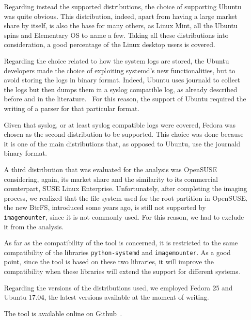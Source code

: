\documentclass[a4paper]{article}
\begin{document}
Regarding instead the supported distributions, the choice of supporting Ubuntu
was quite obvious. This distribution, indeed, apart from having a large market
share by itself, is also the base for many others, as Linux Mint, all the Ubuntu
spins and Elementary OS to name a few. Taking all these distributions into
consideration, a good percentage of the Linux desktop users is covered.

Regarding the choice related to how the system logs are stored, the Ubuntu
developers made the choice of exploiting systemd's new functionalities, but to
avoid storing the logs in binary format. Indeed, Ubuntu uses journald to collect
the logs but then dumps them in a syslog compatible log, as already described
before and in the literature.~\cite{patil2016digital} For this reason, the
support of Ubuntu required the writing of a parser for that particular format.

Given that syslog, or at least syslog compatible logs were covered, Fedora was
chosen as the second distribution to be supported. This choice was done because
it is one of the main distributions that, as opposed to Ubuntu, use the
journald binary format.

A third distribution that was evaluated for the analysis was OpenSUSE
considering, again, its market share and the similarity to its commercial
counterpart, SUSE Linux Enterprise. Unfortunately, after completing the imaging
process, we realized that the file system used for the root partition in
OpenSUSE, the new BtrFS, introduced some years ago, is still not supported by
\texttt{imagemounter}, since it is not commonly used. For this reason, we had to
exclude it from the analysis.

As far as the compatibility of the tool is concerned, it is restricted to the
same compatibility of the libraries \texttt{python-systemd} and
\texttt{imagemounter}. As a good point, since the tool is based on these two
libraries, it will improve the compatibility when these libraries will extend
the support for different systems.

Regarding the versions of the distributions used, we employed Fedora 25 and
Ubuntu 17.04, the latest versions available at the moment of writing.

The tool is available online on Github~\cite{ourtool}.
\end{document}

